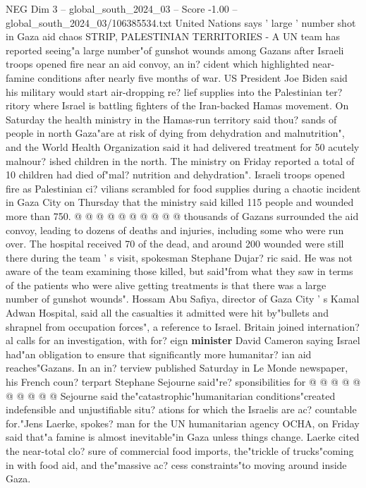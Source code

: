 \begin{textsample}{NEG Dim 3 – global\_south\_2024\_03 – Score -1.00 – global\_south\_2024\_03/106385534.txt}  \label{ex:f3_neg_042}
United Nations says ' large ' number shot in Gaza aid chaos STRIP, PALESTINIAN TERRITORIES - A UN team has reported seeing"a large number"of gunshot wounds among Gazans after Israeli troops opened fire near an aid convoy, an in? cident which highlighted near-famine conditions after nearly five months of war.
US President Joe Biden said his military would start air-dropping re? lief supplies into the Palestinian ter? ritory where Israel is battling fighters of the Iran-backed Hamas movement.
On Saturday the health ministry in the Hamas-run territory said thou? sands of people in north Gaza"are at risk of dying from dehydration and malnutrition", and the World Health Organization said it had delivered treatment for 50 acutely malnour? ished children in the north.
The ministry on Friday reported a total of 10 children had died of"mal? nutrition and dehydration".
Israeli troops opened fire as Palestinian ci? vilians scrambled for food supplies during a chaotic incident in Gaza City on Thursday that the ministry said killed 115 people and wounded more than 750. @ @ @ @ @ @ @ @ @ @ thousands of Gazans surrounded the aid convoy, leading to dozens of deaths and injuries, including some who were run over.
The hospital received 70 of the dead, and around 200 wounded were still there during the team ' s visit, spokesman Stephane Dujar? ric said.
He was not aware of the team examining those killed, but said"from what they saw in terms of the patients who were alive getting treatments is that there was a large number of gunshot wounds".
Hossam Abu Safiya, director of Gaza City ' s Kamal Adwan Hospital, said all the casualties it admitted were hit by"bullets and shrapnel from occupation forces", a reference to Israel.
Britain joined internation? al calls for an investigation, with for? eign \textbf{minister} David Cameron saying Israel had"an obligation to ensure that significantly more humanitar? ian aid reaches"Gazans.
In an in? terview published Saturday in Le Monde newspaper, his French coun? terpart Stephane Sejourne said"re? sponsibilities for @ @ @ @ @ @ @ @ @ @ Sejourne said the"catastrophic"humanitarian conditions"created indefensible and unjustifiable situ? ations for which the Israelis are ac? countable for."Jens Laerke, spokes? man for the UN humanitarian agency OCHA, on Friday said that"a famine is almost inevitable"in Gaza unless things change.
Laerke cited the near-total clo? sure of commercial food imports, the"trickle of trucks"coming in with food aid, and the"massive ac? cess constraints"to moving around inside Gaza.

\end{textsample}
